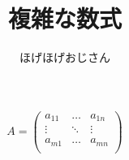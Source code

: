 \documentclass[a4paper, 11pt, uplatex]{jsarticle}
\begin{document}
\title{複雑な数式}
\author{ほげほげおじさん}
\maketitle

\begin{equation*}
	A = \begin{pmatrix}
		a_{11} & \ldots & a_{1n} \\
		\vdots & \ddots & \vdots \\
		a_{m1} & \ldots & a_{mn} \\
	\end{pmatrix}
\end{equation*}
\end{document}
